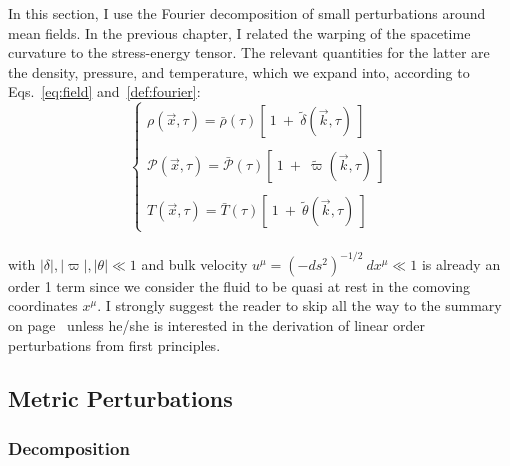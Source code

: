 \vspace*{1.5pc}

In this section, I use the Fourier decomposition of small perturbations around mean fields. In the previous chapter, I related the warping of the spacetime curvature to the stress-energy tensor. The relevant quantities for the latter are the density, pressure, and temperature, which we expand into, according to Eqs.~\ref{eq:field} and~\ref{def:fourier}: \\
\begin{equation}
\left\{
\begin{array}{l}
\rho(\vec{x}, \tau) = \bar{\rho} (\tau) \left[ ~1~ + ~ \tilde{\delta}(\vec{k}, \tau) ~ \right] \\
\\
\mathcal{P}(\vec{x}, \tau) = \bar{\mathcal{P}} (\tau) \left[ ~1~ + ~ \tilde{\varpi}(\vec{k}, \tau) ~ \right] \\
\\
T(\vec{x}, \tau) = \bar{T} (\tau) \left[ ~1~ + ~ \tilde{\theta}(\vec{k}, \tau) ~ \right]
\end{array}
\right.
\end{equation} \\ with $\vert \delta \vert, \vert \varpi \vert, \vert \theta \vert \ll 1$ and bulk velocity $u^\mu = (- ds^2)^{-1/2}~dx^\mu \ll 1$ is already an order 1 term since we consider the fluid to be quasi at rest in the comoving coordinates $x^\mu$. I strongly suggest the reader to skip all the way to the summary on page~\pageref{eq:summary_euler} unless he/she is interested in the derivation of linear order perturbations from first principles.

\subsection{Metric Perturbations}

\subsubsection{Decomposition}

